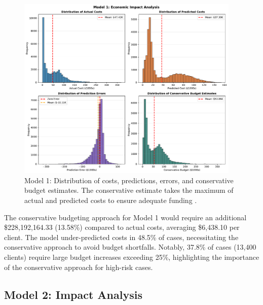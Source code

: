 \begin{figure}[htbp]
\centering
\includegraphics[width=0.95\textwidth]{figures/model_1_Impact_Histograms.pdf}
\caption{Model 1: Distribution of costs, predictions, errors, and conservative budget estimates. The conservative estimate takes the maximum of actual and predicted costs to ensure adequate funding \FiscalYear.}
\label{fig:model1_impact_histograms}
\end{figure}

The conservative budgeting approach for Model 1 would require an additional \$228,192,164.33 (13.58\%) compared to actual costs, averaging \$6,438.10 per client. The model under-predicted costs in 48.5\% of cases, necessitating the conservative approach to avoid budget shortfalls. Notably, 37.8\% of cases (13,400 clients) require large budget increases exceeding 25\%, highlighting the importance of the conservative approach for high-risk cases. 

\clearpage

\subsection{Model 2: Impact Analysis}
\label{subsec:model2_impact}

